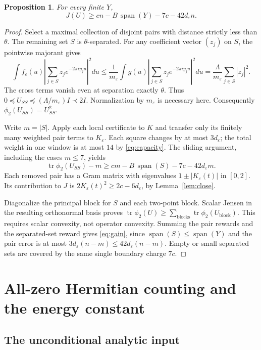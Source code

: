 \documentclass[11pt,a4paper]{article}
\newtheorem{proposition}[theorem]{Proposition}
\theoremstyle{remark}
\DeclareMathOperator{\tr}{tr}
\begin{document}
\begin{proposition}\label{prop:lossless}
For every finite $Y$,
\begin{equation}\label{eq:gain}
 J(U)\ge cn-B\,\operatorname{span}(Y)-7c-42d_\varepsilon n.
\end{equation}
\end{proposition}
\begin{proof}
Select a maximal collection of disjoint pairs with distance
strictly less than $\theta$. The remaining set $S$ is
$\theta$-separated. For any coefficient vector $(z_j)$ on $S$,
the pointwise majorant gives
\[
 \int f_\varepsilon(u)\left|\sum_{j\in S}z_je^{-2\pi iy_ju}\right|^2du
 \le\frac1{m_\varepsilon}
 \int g(u)\left|\sum_{j\in S}z_je^{-2\pi iy_ju}\right|^2du
 =\frac{\Lambda}{m_\varepsilon}\sum_{j\in S}|z_j|^2 .
\]
The cross terms vanish even at separation exactly $\theta$.
Thus $0\preceq U_{SS}\preceq(\Lambda/m_\varepsilon)I\prec2I$.
Normalization by $m_\varepsilon$ is necessary here.
Consequently $\phi_2(U_{SS})=U_{SS}^2$.

Write $m=|S|$. Apply each local certificate to $K$ and transfer
only its finitely many weighted pair terms to $K_\varepsilon$.
Each square changes by at most $3d_\varepsilon$; the total
weight in one window is at most $14$ by \eqref{eq:capacity}.
The sliding argument, including the cases $m\le7$, yields
\[
 \tr\phi_2(U_{SS})-m
 \ge cm-B\,\operatorname{span}(S)-7c-42d_\varepsilon m .
\]
Each removed pair has a Gram matrix with eigenvalues
$1\pm|K_\varepsilon(t)|$ in $[0,2]$.
Its contribution to $J$ is
$2K_\varepsilon(t)^2\ge2c-6d_\varepsilon$, by
Lemma~\ref{lem:close}.

Diagonalize the principal block for $S$ and each two-point block.
Scalar Jensen in the resulting orthonormal basis proves
$\tr\phi_2(U)\ge\sum_{\text{blocks}}\tr\phi_2(U_{\text{block}})$.
This requires scalar convexity, not operator convexity.
Summing the pair rewards and the separated-set reward gives
\eqref{eq:gain}, since $\operatorname{span}(S)\le
\operatorname{span}(Y)$ and the pair error is at most
$3d_\varepsilon(n-m)\le42d_\varepsilon(n-m)$.
Empty or small separated sets are covered by the same single
boundary charge $7c$.
\end{proof}

\section{All-zero Hermitian counting and the energy constant}

\subsection{The unconditional analytic input}
\end{document}
